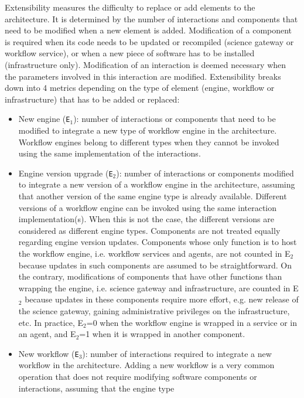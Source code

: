 \documentclass[preprint,3p,twocolumn]{elsarticle}
\begin{document}
Extensibility measures the difficulty to replace or add elements to
the architecture. It is determined by the number of interactions and
components that need to be modified when a new element is
added. Modification of a component is required when its code needs to
be updated or recompiled (science gateway or workflow service), or
when a new piece of software has to be installed (infrastructure
only). Modification of an interaction is deemed necessary when the
parameters involved in this interaction are modified.  Extensibility
breaks down into 4 metrics depending on the type of element (engine,
workflow or infrastructure) that has to be added or replaced:
\begin{itemize}[leftmargin=0cm,itemindent=0.35cm,itemsep=0cm]
\item New engine (\texttt{E$_1$}): number of interactions or
  components that need to be modified to integrate a new type of
  workflow engine in the architecture. Workflow engines belong to
  different types when they cannot be invoked using the same
  implementation of the interactions.
 \item Engine version upgrade (\texttt{E$_2$}): number of interactions
  or components modified to integrate a new version of a workflow
  engine in the architecture, assuming that another version of the
  same engine type is already available. Different versions of a
  workflow engine can be invoked using the same interaction
  implementation(s). When this is not the case, the different versions
  are considered as different engine types. Components are not treated
  equally regarding engine version updates. Components whose only
  function is to host the workflow engine, i.e. workflow services and
  agents, are not counted in E$_2$ because updates in such components
  are assumed to be straightforward. On the contrary, modifications of
  components that have other functions than wrapping the engine,
  i.e. science gateway and infrastructure, are counted in E$_2$
  because updates in these components require more effort, e.g. new
  release of the science gateway, gaining administrative privileges on
  the infrastructure, etc. In practice, E$_2$=0 when the workflow
  engine is wrapped in a service or in an agent, and E$_2$=1 when it is
  wrapped in another component.  
\item New workflow (\texttt{E$_3$}): number of interactions required
  to integrate a new workflow in the architecture. Adding a new
  workflow is a very common operation that does not require modifying
  software components or interactions, assuming that the engine type

\end{itemize}
\end{document}
